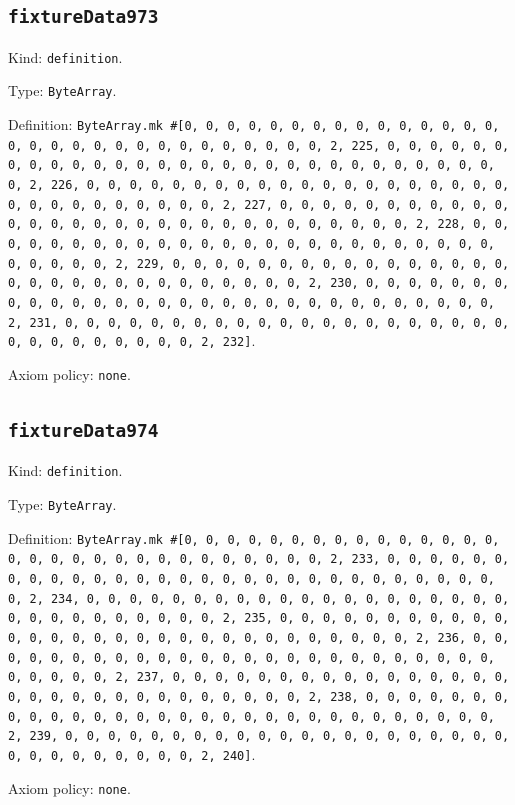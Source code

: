 \documentclass[11pt]{article}
\begin{document}
\subsection*{\texttt{fixtureData973}}
\noindent Kind: \texttt{definition}.\par
\noindent Type: \texttt{ByteArray}.\par
\noindent Definition: \texttt{ByteArray.mk \#[0, 0, 0, 0, 0, 0, 0, 0, 0, 0, 0, 0, 0, 0, 0, 0, 0, 0, 0, 0, 0, 0, 0, 0, 0, 0, 0, 0, 0, 0, 2, 225, 0, 0, 0, 0, 0, 0, 0, 0, 0, 0, 0, 0, 0, 0, 0, 0, 0, 0, 0, 0, 0, 0, 0, 0, 0, 0, 0, 0, 0, 0, 2, 226, 0, 0, 0, 0, 0, 0, 0, 0, 0, 0, 0, 0, 0, 0, 0, 0, 0, 0, 0, 0, 0, 0, 0, 0, 0, 0, 0, 0, 0, 0, 2, 227, 0, 0, 0, 0, 0, 0, 0, 0, 0, 0, 0, 0, 0, 0, 0, 0, 0, 0, 0, 0, 0, 0, 0, 0, 0, 0, 0, 0, 0, 0, 2, 228, 0, 0, 0, 0, 0, 0, 0, 0, 0, 0, 0, 0, 0, 0, 0, 0, 0, 0, 0, 0, 0, 0, 0, 0, 0, 0, 0, 0, 0, 0, 2, 229, 0, 0, 0, 0, 0, 0, 0, 0, 0, 0, 0, 0, 0, 0, 0, 0, 0, 0, 0, 0, 0, 0, 0, 0, 0, 0, 0, 0, 0, 0, 2, 230, 0, 0, 0, 0, 0, 0, 0, 0, 0, 0, 0, 0, 0, 0, 0, 0, 0, 0, 0, 0, 0, 0, 0, 0, 0, 0, 0, 0, 0, 0, 2, 231, 0, 0, 0, 0, 0, 0, 0, 0, 0, 0, 0, 0, 0, 0, 0, 0, 0, 0, 0, 0, 0, 0, 0, 0, 0, 0, 0, 0, 0, 0, 2, 232]}.\par
\noindent Axiom policy: \texttt{none}.\par
\subsection*{\texttt{fixtureData974}}
\noindent Kind: \texttt{definition}.\par
\noindent Type: \texttt{ByteArray}.\par
\noindent Definition: \texttt{ByteArray.mk \#[0, 0, 0, 0, 0, 0, 0, 0, 0, 0, 0, 0, 0, 0, 0, 0, 0, 0, 0, 0, 0, 0, 0, 0, 0, 0, 0, 0, 0, 0, 2, 233, 0, 0, 0, 0, 0, 0, 0, 0, 0, 0, 0, 0, 0, 0, 0, 0, 0, 0, 0, 0, 0, 0, 0, 0, 0, 0, 0, 0, 0, 0, 2, 234, 0, 0, 0, 0, 0, 0, 0, 0, 0, 0, 0, 0, 0, 0, 0, 0, 0, 0, 0, 0, 0, 0, 0, 0, 0, 0, 0, 0, 0, 0, 2, 235, 0, 0, 0, 0, 0, 0, 0, 0, 0, 0, 0, 0, 0, 0, 0, 0, 0, 0, 0, 0, 0, 0, 0, 0, 0, 0, 0, 0, 0, 0, 2, 236, 0, 0, 0, 0, 0, 0, 0, 0, 0, 0, 0, 0, 0, 0, 0, 0, 0, 0, 0, 0, 0, 0, 0, 0, 0, 0, 0, 0, 0, 0, 2, 237, 0, 0, 0, 0, 0, 0, 0, 0, 0, 0, 0, 0, 0, 0, 0, 0, 0, 0, 0, 0, 0, 0, 0, 0, 0, 0, 0, 0, 0, 0, 2, 238, 0, 0, 0, 0, 0, 0, 0, 0, 0, 0, 0, 0, 0, 0, 0, 0, 0, 0, 0, 0, 0, 0, 0, 0, 0, 0, 0, 0, 0, 0, 2, 239, 0, 0, 0, 0, 0, 0, 0, 0, 0, 0, 0, 0, 0, 0, 0, 0, 0, 0, 0, 0, 0, 0, 0, 0, 0, 0, 0, 0, 0, 0, 2, 240]}.\par
\noindent Axiom policy: \texttt{none}.\par
\end{document}
